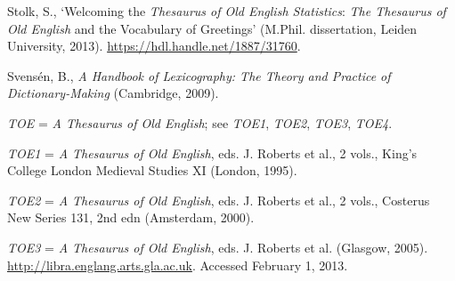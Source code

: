 \begin{list}{}




\item %
Stolk, S., `Welcoming the \textit{Thesaurus of Old English Statistics}: \textit{The Thesaurus of Old English} and the Vocabulary of Greetings' (M.Phil. dissertation, Leiden University, 2013). \url{https://hdl.handle.net/1887/31760}.


\item %
Svensén, B., \textit{A Handbook of Lexicography: The Theory and Practice of Dictionary-Making} (Cambridge, 2009).


\item %
\textit{TOE} = \textit{A Thesaurus of Old English}; see \textit{TOE1}, \textit{TOE2}, \textit{TOE3}, \textit{TOE4}.

\item %
\textit{TOE1} =	\textit{A Thesaurus of Old English}, eds. J. Roberts et al., 2 vols., King's College London Medieval Studies XI (London, 1995). 

\item %
\textit{TOE2} = \textit{A Thesaurus of Old English}, eds. J. Roberts et al., 2 vols., Costerus New Series 131, 2nd edn (Amsterdam, 2000).

\item %
\textit{TOE3} = \textit{A Thesaurus of Old English}, eds. J. Roberts et al. (Glasgow, 2005). \url{http://libra.englang.arts.gla.ac.uk}. Accessed February 1, 2013.


\end{list}
